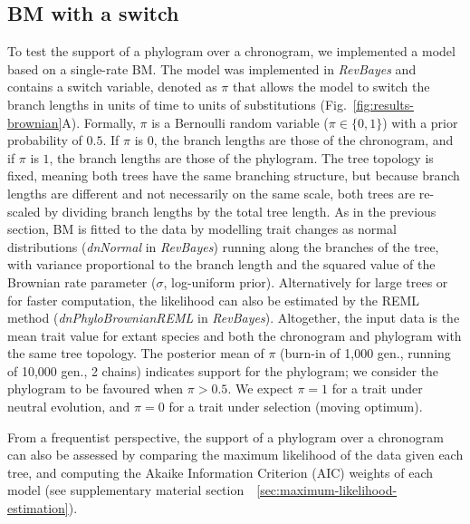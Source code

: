 \documentclass{article}
\newcommand{\PhyloSupport}{\pi}
\begin{document}
\subsection*{BM with a switch}
To test the support of a phylogram over a chronogram, we implemented a model based on a single-rate BM.
The model was implemented in \textit{RevBayes} and contains a switch variable, denoted as $\PhyloSupport$ that allows the model to switch the branch lengths in units of time to units of substitutions (Fig.~\ref{fig:results-brownian}A).
Formally, $\PhyloSupport$ is a Bernoulli random variable ($\PhyloSupport \in \{0, 1\}$) with a prior probability of $0.5$.
If $\PhyloSupport$ is $0$, the branch lengths are those of the chronogram, and if $\PhyloSupport$ is $1$, the branch lengths are those of the phylogram.
The tree topology is fixed, meaning both trees have the same branching structure, but because branch lengths are different and not necessarily on the same scale, both trees are re-scaled by dividing branch lengths by the total tree length.
As in the previous section, BM is fitted to the data by modelling trait changes as normal distributions (\textit{dnNormal} in \textit{RevBayes}) running along the branches of the tree, with variance proportional to the branch length and the squared value of the Brownian rate parameter ($\sigma$, log-uniform prior).
Alternatively for large trees or for faster computation, the likelihood can also be estimated by the REML method (\textit{dnPhyloBrownianREML} in \textit{RevBayes}).
Altogether, the input data is the mean trait value for extant species and both the chronogram and phylogram with the same tree topology.
The posterior mean of $\PhyloSupport$ (burn-in of 1,000 gen., running of 10,000 gen., 2 chains) indicates support for the phylogram; we consider the phylogram to be favoured when $\PhyloSupport > 0.5$.
We expect $\PhyloSupport = 1$ for a trait under neutral evolution, and $\PhyloSupport = 0$ for a trait under selection (moving optimum).

From a frequentist perspective, the support of a phylogram over a chronogram can also be assessed by comparing the maximum likelihood of the data given each tree, and computing the Akaike Information Criterion (AIC) weights of each model (see supplementary material section~~\ref{sec:maximum-likelihood-estimation}).
\end{document}
